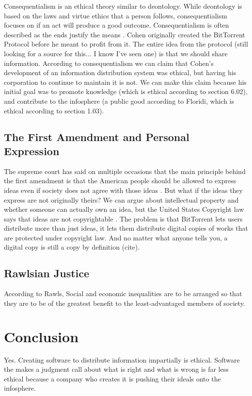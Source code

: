 \documentclass[11pt]{article}
\begin{document}
Consequentialism is an ethical theory similar to deontology. While deontology is based on the laws and virtue ethics that a person follows, consequentialism focuses on if an act will produce a good outcome. Consequentialism is often described as the ends justify the means \cite{cons}. Cohen originally created the BitTorrent Protocol before he meant to profit from it. The entire idea from the protocol (still looking for a source for this... I know I've seen one) is that we should share information. According to consequentialism we can claim that Cohen's development of an information distribution system was ethical, but having his corporation to continue to maintain it is not. We can make this claim because his initial goal was to promote knowledge (which is ethical according to section 6.02), and contribute to the infosphere (a public good according to Floridi\cite[4]{floridiInfo}, which is ethical according to section 1.03).

\subsection{The First Amendment and Personal Expression}

The supreme court has said on multiple occasions that the main principle behind the first amendment is that the American people should be allowed to express ideas even if society does not agree with those ideas \cite[51]{1988hustler}. But what if the ideas they express are not originally theirs? We can argue about intellectual property and whether someone can actually own an idea, but the United States Copyright law says that ideas are not copyrightable \cite{t17c1s103}. The problem is that BitTorrent lets users distribute more than just ideas, it lets them distribute digital copies of works that are protected under copyright law. And no matter what anyone tells you, a digital copy is still a copy by definition (cite).

\subsection{Rawlsian Justice}

According to Rawls, Social and economic inequalities are to be arranged so that they are to be of the greatest benefit to the least-advantaged members of society.

\section{Conclusion}
Yes. Creating software to distribute information impartially is ethical. Software the makes a judgment call about what is right and what is wrong is far less ethical because a company who creates it is pushing their ideals onto the infosphere.

\newpage
\singlespacing


\end{document}
